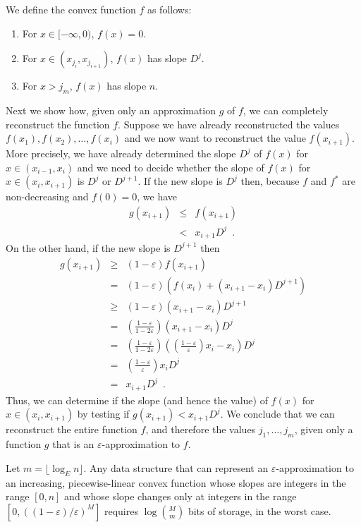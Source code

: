 \documentclass[charterfonts,lotsofwhite]{patmorin}
\newcommand{\eps}{\varepsilon}
\begin{document}
We define the convex function $f$ as follows:
\begin{enumerate}
\item For $x\in [-\infty,0)$, $f(x)=0$.
\item For $x\in (x_{j_i},x_{j_{i+1}})$, $f(x)$ has slope $D^j$.
\item For $x>j_m$, $f(x)$ has slope $n$.
\end{enumerate}

Next we show how, given only an approximation $g$ of $f$, we can
completely reconstruct the function $f$. Suppose we have already
reconstructed the values $f(x_1),f(x_2),\ldots,f(x_{i})$ and we 
now want to reconstruct the value $f(x_{i+1})$.  More precisely, we
have already determined the slope $D^j$ of $f(x)$ for $x\in
(x_{i-1},x_{i})$ and we need to decide whether the slope of $f(x)$ for
$x\in(x_i,x_{i+1})$ is $D^j$ or $D^{j+1}$.  If the new slope is $D^j$
then, because $f$ and $f^*$ are non-decreasing and $f(0)=0$, we have
\begin{eqnarray*}
   g(x_{i+1}) & \le & f(x_{i+1}) \\
    & < & x_{i+1}D^j \enspace . 
\end{eqnarray*}
On the other hand, if the new slope is $D^{j+1}$ then
\begin{eqnarray*}
   g(x_{i+1}) 
    & \ge & (1-\eps)f(x_{i+1}) \\
    & = & (1-\eps)(f(x_i) + (x_{i+1}-x_i)D^{j+1}) \\
    & \ge & (1-\eps)(x_{i+1}-x_i)D^{j+1} \\ 
    & = & \left(\frac{1-\eps}{1-2\eps}\right)(x_{i+1}-x_i)D^{j} \\ 
    & = &
\left(\frac{1-\eps}{1-2\eps}\right)\left(\left(\frac{1-\eps}{\eps}\right)x_i-x_i\right)D^{j} \\ 
    & = & \left(\frac{1-\eps}{\eps}\right)x_iD^j \\
    & = & x_{i+1}D^j \enspace .
\end{eqnarray*}
Thus, we can determine if the slope (and hence the value) of $f(x)$
for $x\in (x_i,x_{i+1})$ by testing if $g(x_{i+1}) < x_{i+1}D^j$.  We
conclude that we can reconstruct the entire function $f$, and
therefore the values $j_1,\ldots,j_m$, given only a function $g$ that
is an $\eps$-approximation to $f$. 

\begin{thm}
Let $m=\lfloor\log_E n\rfloor$.  Any data structure that can represent
an $\eps$-approximation to an increasing, piecewise-linear convex
function whose slopes are integers in the range $[0,n]$ and whose
slope changes only at integers in the range $[0,((1-\eps)/\eps)^M]$
requires $\log {M\choose m}$ bits of storage, in the worst case.
 \end{thm}
\end{document}
